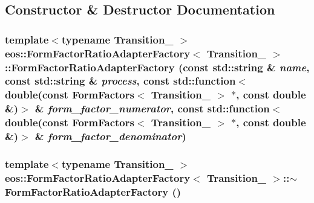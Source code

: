 \subsection{Constructor \& Destructor Documentation}
\hypertarget{classeos_1_1FormFactorRatioAdapterFactory_ab689206dfaa84be97e8dd716212dd188}{
\subsubsection[{FormFactorRatioAdapterFactory}]{\setlength{\rightskip}{0pt plus 5cm}template$<$typename Transition\_\- $>$ {\bf eos::FormFactorRatioAdapterFactory}$<$ Transition\_\- $>$::{\bf FormFactorRatioAdapterFactory} (const std::string \& {\em name}, \/  const std::string \& {\em process}, \/  const std::function$<$ double(const FormFactors$<$ Transition\_\- $>$ $\ast$, const double \&)$>$ \& {\em form\_\-factor\_\-numerator}, \/  const std::function$<$ double(const FormFactors$<$ Transition\_\- $>$ $\ast$, const double \&)$>$ \& {\em form\_\-factor\_\-denominator})}}
\label{classeos_1_1FormFactorRatioAdapterFactory_ab689206dfaa84be97e8dd716212dd188}
\hypertarget{classeos_1_1FormFactorRatioAdapterFactory_a5a0c7286de7904c591dbf57d141e7216}{
\subsubsection[{$\sim$FormFactorRatioAdapterFactory}]{\setlength{\rightskip}{0pt plus 5cm}template$<$typename Transition\_\- $>$ {\bf eos::FormFactorRatioAdapterFactory}$<$ Transition\_\- $>$::$\sim${\bf FormFactorRatioAdapterFactory} ()}}
\label{classeos_1_1FormFactorRatioAdapterFactory_a5a0c7286de7904c591dbf57d141e7216}


